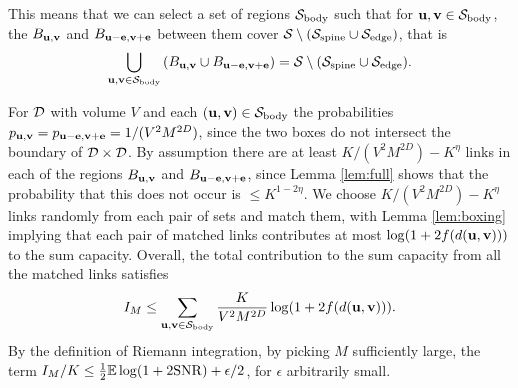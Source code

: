\documentclass[journal]{IEEEtran}
\begin{document}
\begin{IEEEproof}
This means that we can select a set of regions ${\mathcal{S}}_{\rm body}$ such that for 
${\mathbf{ u}},{\mathbf{ v}} \in {\mathcal{S}}_{\rm body}$, the $B_{{\mathbf{ u}},{\mathbf{ v}}}$ and $B_{{\mathbf{ u-e}},{\mathbf{ v+e}}}$ between them cover
${\mathcal{S}} \setminus ({\mathcal{S}}_{\rm spine} \cup {\mathcal{S}}_{\rm edge})$, that is
$$ \bigcup_{{\mathbf{ u}},{\mathbf{ v}} \in {\mathcal{S}}_{\rm body}} \left( B_{{\mathbf{ u}},{\mathbf{ v}}} \cup B_{{\mathbf{ u-e}},{\mathbf{ v+e}}} \right)
= {\mathcal{S}} \setminus ({\mathcal{S}}_{\rm spine} \cup {\mathcal{S}}_{\rm edge}). $$

For ${\mathcal{D}}$ with volume $V$ and each $({\mathbf{ u}},{\mathbf{ v}}) \in {\mathcal{S}}_{\rm body}$  the probabilities
$p_{{\mathbf{ u}},{\mathbf{ v}}} = p_{{\mathbf{ u-e}},{\mathbf{ v+e}}} = 1/(V^2 M^{2D})$, since the two boxes do not intersect
the boundary of ${\mathcal{D}} \times {\mathcal{D}}$.
By assumption
there are at least $K/(V^2 M^{2D}) - K^{\eta}$ links in each of the regions
$B_{{\mathbf{ u}},{\mathbf{ v}}}$ and $B_{{\mathbf{ u-e}},{\mathbf{ v+e}}}$,
since Lemma \ref{lem:full} shows
that the probability that this does not occur is $\leq K^{1-2\eta}$.
We choose $K/(V^2 M^{2D}) - K^{\eta}$
links randomly from each pair of sets and match them, with Lemma \ref{lem:boxing} implying that  
each pair of matched links contributes
at most $\log(1 + 2 f(d({\mathbf{ u}},{\mathbf{ v}})))$ to the sum capacity. 
Overall, 
the total contribution to the sum capacity from all the matched links satisfies
\begin{equation} \label{eq:matchedsum}
  I_M \leq \sum_{{\mathbf{ u}},{\mathbf{ v}} \in {\mathcal{S}}_{\rm body}} \frac{K}{V^2 M^{2D}} 
\log(1 + 2 f(d({\mathbf{ u}},{\mathbf{ v}}))).\end{equation}
By the definition of Riemann integration, by picking $M$
sufficiently large, the term $I_M/K \leq \frac{1}{2} {\mathbb {E}} \log(1 + 2 {\rm{SNR}}) + \epsilon/2$,
for $\epsilon$ arbitrarily small.


\end{IEEEproof}
\end{document}
